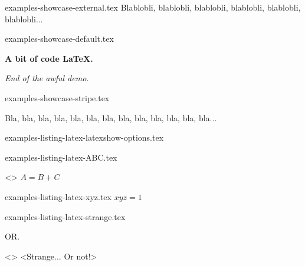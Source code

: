 \begin{filecontents*}[overwrite]{examples-showcase-external.tex}
Blablobli, blablobli, blablobli, blablobli, blablobli, blablobli...
\end{filecontents*}


\begin{filecontents*}[overwrite]{examples-showcase-default.tex}
\begin{tdocshowcase}
    \bfseries A bit of code \LaTeX.

    \bigskip

    \emph{\large End of the awful demo.}
\end{tdocshowcase}
\end{filecontents*}


\begin{filecontents*}[overwrite]{examples-showcase-stripe.tex}
\begin{tdocshowcase}[style = stripe]
    Bla, bla, bla, bla, bla, bla, bla, bla, bla, bla, bla, bla, bla...
\end{tdocshowcase}
\end{filecontents*}


\begin{filecontents*}[overwrite]{examples-listing-latex-latexshow-options.tex}
\end{filecontents*}


\begin{filecontents*}[overwrite]{examples-listing-latex-ABC.tex}
\begin{tdoclatex}<>
$A = B + C$
\end{tdoclatex}
\end{filecontents*}


\begin{filecontents*}[overwrite]{examples-listing-latex-xyz.tex}
$x y z = 1$
\end{filecontents*}


\begin{filecontents*}[overwrite]{examples-listing-latex-strange.tex}
\begin{tdoclatex}
\end{tdoclatex}
OR.
\begin{tdoclatex}<>
\string<Strange... Or not!>
\end{tdoclatex}
\end{filecontents*}


